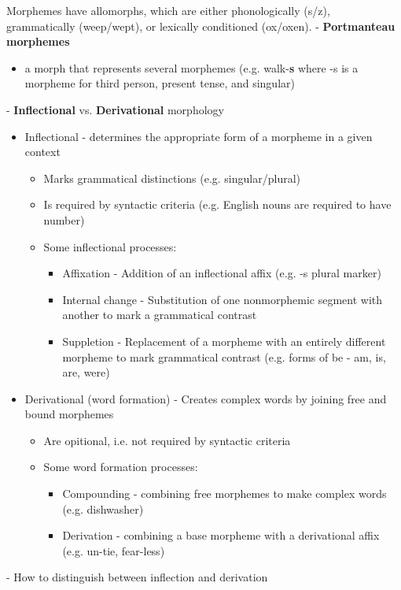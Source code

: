 \documentclass[11pt]{article}
\newenvironment{itemise}{
\begin{itemize}
  \setlength{\itemsep}{1pt}
  \setlength{\parskip}{0pt}
  \setlength{\parsep}{0pt}
}{\end{itemize}}
\begin{document}
Morphemes have allomorphs, which are either phonologically (s/z), grammatically (weep/wept), or lexically conditioned (ox/oxen).
- {\bf Portmanteau morphemes}
\begin{itemise}
 \item a morph that represents several morphemes (e.g. walk-{\bf s} where -s is a morpheme for third person, present tense, and singular)
\end{itemise}
- {\bf Inflectional} vs. {\bf Derivational} morphology
\begin{itemise}
 \item Inflectional - determines the appropriate form of a morpheme in a given context
  \begin{itemise}
   \item Marks grammatical distinctions (e.g. singular/plural) 
   \item Is required by syntactic criteria (e.g. English nouns are required to have number)
   \item Some inflectional processes:
    \begin{itemise}
     \item Affixation - Addition of an inflectional affix (e.g. -s plural marker)
     \item Internal change - Substitution of one nonmorphemic segment with another to mark a grammatical contrast
     \item Suppletion - Replacement of a morpheme with an entirely different morpheme to mark grammatical contrast (e.g. forms of be - am, is, are, were)
    \end{itemise}
  \end{itemise}
 \item Derivational (word formation) - Creates complex words by joining free and bound morphemes 
  \begin{itemise}
   \item Are opitional, i.e. not required by syntactic criteria
   \item Some word formation processes:
    \begin{itemise}
     \item Compounding - combining free morphemes to make complex words (e.g. dishwasher)
     \item Derivation - combining a base morpheme with a derivational affix (e.g. un-tie, fear-less)
    \end{itemise}
  \end{itemise}
\end{itemise}
- How to distinguish between inflection and derivation
\end{document}
